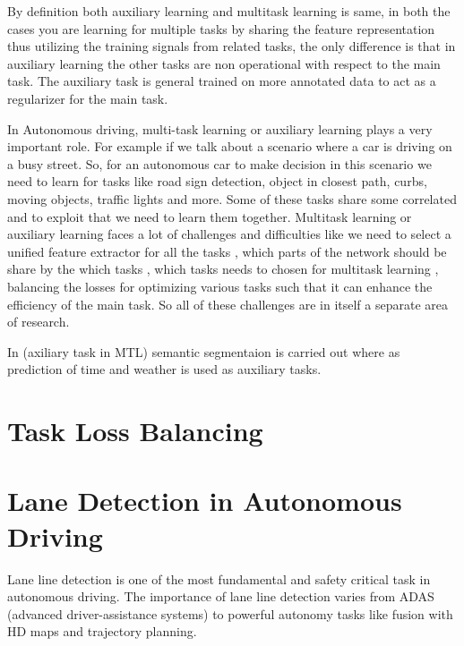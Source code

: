     By definition both auxiliary learning and multitask learning is same, in both the cases you are learning for multiple tasks by sharing the feature representation thus utilizing the training signals from related tasks, the only difference is that in auxiliary learning the other tasks are non operational with respect to the main task. The auxiliary task is general trained on more annotated data to act as a regularizer for the main task. 
    
    In Autonomous driving, multi-task learning or auxiliary learning plays a very important role. For example if we talk about a scenario where a car is driving on a busy street. So, for an autonomous car to make decision in this scenario we need to learn for tasks like road sign detection, object in closest path, curbs, moving objects, traffic lights and more. Some of these tasks share some correlated and to exploit that we need to learn them together. Multitask learning or auxiliary learning faces a lot of challenges and difficulties like we need to select a unified feature extractor for all the tasks \cite{} \cite{}, which parts of the network should be share by the which tasks \cite {}, which tasks needs to chosen for multitask learning \cite{} , balancing the losses for optimizing various tasks such that it can enhance the efficiency of the main task. So all of these challenges are in itself a separate area of research.  
    
    In \cite{} (axiliary task in MTL) semantic segmentaion is carried out where as prediction of time and weather is used as auxiliary tasks.  
    
    \section{Task Loss Balancing}
    \section{Lane Detection in Autonomous Driving}
    Lane line detection is one of the most fundamental and safety critical task in autonomous driving. The importance of lane line detection varies from ADAS (advanced driver-assistance systems) to powerful autonomy tasks like fusion with HD maps and trajectory planning.
